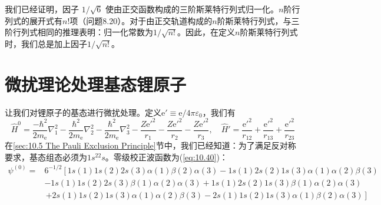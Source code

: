     我们已经证明，因子 $1/\sqrt{6}$ 使由正交函数构成的三阶斯莱特行列式归一化。$n$阶行列式的展开式有$n!$项（问题8.20）。对于由正交轨道构成的$n$阶斯莱特行列式，与三阶行列式相同的推理表明：归一化常数为$1/\sqrt{n!}$。因此，在定义$n$阶斯莱特行列式时，我们总是加上因子$1/\sqrt{n!}$。

\section{微扰理论处理基态锂原子}
\label{sec:10.7 Perturbation Treatment of the Lithium Ground State}

    让我们对锂原子的基态进行微扰处理。定义$\mathrm{e}' \equiv \mathrm{e} / 4\pi \varepsilon_0$，我们有
    \begin{equation*}
        \hat{H}^0 = \frac{-\hbar^2}{2m_{\mathrm{e}}}\nabla_1^2 - \frac{\hbar^2}{2m_{\mathrm{e}}}\nabla_2^2 - \frac{\hbar^2}{2m_{\mathrm{e}}}\nabla_3^2 - \frac{Z\mathrm{e}'^2}{r_{1}} - \frac{Z\mathrm{e}'^2}{r_{2}} - \frac{Z\mathrm{e}'^2}{r_{3}}, \quad \hat{H}' = \frac{\mathrm{e}'^2}{r_{12}} + \frac{\mathrm{e}'^2}{r_{13}} + \frac{\mathrm{e}'^2}{r_{23}}
    \end{equation*}
    在\ref{sec:10.5 The Pauli Exclusion Principle}节中，我们已经知道：为了满足反对称要求，基态组态必须为$1s^22s$。零级校正波函数为(\ref{eq:10.40})：
    \begin{equation}
        \begin{aligned}
            \psi^{\left(0\right)} = &6^{-1/2} \left[1s\left(1\right)1s\left(2\right)2s\left(3\right)\alpha\left(1\right)\beta\left(2\right)\alpha\left(3\right) - 1s\left(1\right)2s\left(2\right)1s\left(3\right)\alpha\left(1\right)\alpha\left(2\right)\beta\left(3\right)\right. \\
            &- 1s\left(1\right)1s\left(2\right)2s\left(3\right)\beta\left(1\right)\alpha\left(2\right)\alpha\left(3\right) + 1s\left(1\right)2s\left(2\right)1s\left(3\right)\beta\left(1\right)\alpha\left(2\right)\alpha\left(3\right) \\
            &\, \left. + 2s\left(1\right)1s\left(2\right)1s\left(3\right)\alpha\left(1\right)\alpha\left(2\right)\beta\left(3\right) - 2s\left(1\right)1s\left(2\right)1s\left(3\right)\alpha\left(1\right)\beta\left(2\right)\alpha\left(3\right)\right]
            \label{eq:10.48}
        \end{aligned}
    \end{equation}

